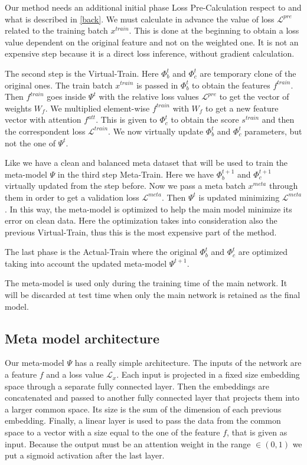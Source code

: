 \documentclass[runningheads]{llncs}
\begin{document}
	Our method needs an additional initial phase Loss Pre-Calculation respect to \cite{shu2019meta} and what is described in \ref{back}. We must calculate in advance the value of loss $\mathcal{L}^{pre}$ related to the training batch $x^{train}$. This is done at the beginning to obtain a loss value dependent on the original feature and not on the weighted one. It is not an expensive step because it is a direct loss inference, without gradient calculation.
	
	The second step is the Virtual-Train. Here $\Phi_b^t$ and $\Phi_c^t$ are temporary clone of the original ones. The train batch $x^{train}$ is passed in $\Phi_b^t$ to obtain the features $f^{train}$. Then $f^{train}$ goes inside $\Psi^t$ with the relative loss values $\mathcal{L}^{pre}$ to get the vector of weights $W_f$. We multiplied element-wise $f^{train}$ with $W_f$ to get a new feature vector with attention $f^{att}$. This is given to $\Phi_c^t$ to obtain the score $s^{train}$ and then the correspondent loss $\mathcal{L}^{train}$. We now virtually update $\Phi_b^t$ and $\Phi_c^t$ parameters, but not the one of $\Psi^t$.
	
	Like \cite{shu2019meta} we have a clean and balanced meta dataset that will be used to train the meta-model $\Psi$ in the third step Meta-Train. Here we have $\Phi_b^{t+1}$ and $\Phi_c^{t+1}$ virtually updated from the step before. Now we pass a meta batch $x^{meta}$ through them in order to get a validation loss $\mathcal{L}^{meta}$. Then $\Psi^t$ is updated minimizing $\mathcal{L}^{meta}$. In this way, the meta-model is optimized to help the main model minimize its error on clean data. Here the optimization takes into consideration also the previous Virtual-Train, thus this is the most expensive part of the method.
	
	The last phase is the Actual-Train where the original $\Phi_b^t$ and $\Phi_c^t$ are optimized taking into account the updated meta-model $\Psi^{t+1}$.
	
	The meta-model is used only during the training time of the main network. It will be discarded at test time when only the main network is retained as the final model.
	
	\subsection{Meta model architecture}
	
	Our meta-model $\Psi$ has a really simple architecture. The inputs of the network are a feature $f$ and a loss value $\mathcal{L}_x$. Each input is projected in a fixed size embedding space through a separate fully connected layer. Then the embeddings are concatenated and passed to another fully connected layer that projects them into a larger common space. Its size is the sum of the dimension of each previous embedding. Finally, a linear layer is used to pass the data from the common space to a vector with a size equal to the one of the feature $f$, that is given as input. Because the output must be an attention weight in the range $\in (0,1)$ we put a sigmoid activation after the last layer.
	
\end{document}
